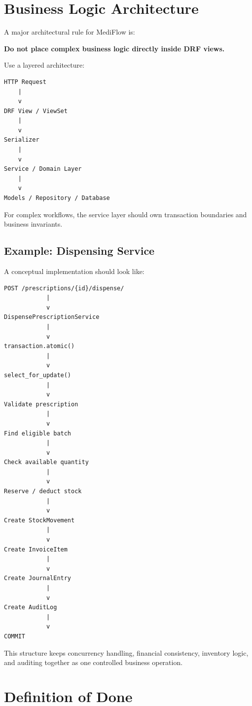 \documentclass[11pt,a4paper]{article}
\begin{document}
\section{Business Logic Architecture}

A major architectural rule for MediFlow is:

\begin{center}
\Large
\textbf{Do not place complex business logic directly inside DRF views.}
\end{center}

Use a layered architecture:

\begin{lstlisting}
HTTP Request
    |
    v
DRF View / ViewSet
    |
    v
Serializer
    |
    v
Service / Domain Layer
    |
    v
Models / Repository / Database
\end{lstlisting}

For complex workflows, the service layer should own transaction boundaries
and business invariants.

\subsection{Example: Dispensing Service}

A conceptual implementation should look like:

\begin{lstlisting}
POST /prescriptions/{id}/dispense/
            |
            v
DispensePrescriptionService
            |
            v
transaction.atomic()
            |
            v
select_for_update()
            |
            v
Validate prescription
            |
            v
Find eligible batch
            |
            v
Check available quantity
            |
            v
Reserve / deduct stock
            |
            v
Create StockMovement
            |
            v
Create InvoiceItem
            |
            v
Create JournalEntry
            |
            v
Create AuditLog
            |
            v
COMMIT
\end{lstlisting}

This structure keeps concurrency handling, financial consistency, inventory
logic, and auditing together as one controlled business operation.

\section{Definition of Done}
\end{document}
